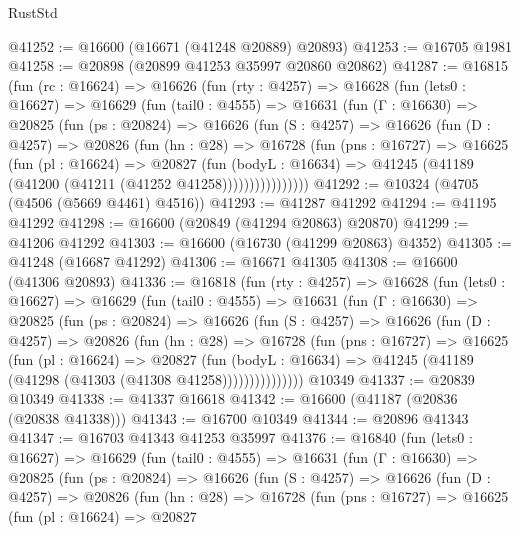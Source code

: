 \begin{lexlean}{RustStd}
\begin{coremodule}
{\begin{coremodule}
{{{{{{{{{{{{{{{{{{{{{{{{{{{{{{{{{{{{{{{{{{{{{{{{{{{{{{{@41252 := @16600 (@16671 (@41248 @20889) @20893)
@41253 := @16705 @1981
@41258 := @20898 (@20899 @41253 @35997 @20860 @20862)
@41287 := @16815
    (fun (rc : @16624) =>
    @16626
      (fun (rty : @4257) =>
      @16628
        (fun (lets0 : @16627) =>
        @16629
          (fun (tail0 : @4555) =>
          @16631
            (fun (Γ : @16630) =>
            @20825
              (fun (ps : @20824) =>
              @16626
                (fun (S : @4257) =>
                @16626
                  (fun (D : @4257) =>
                  @20826
                    (fun (hn : @28) =>
                    @16728
                      (fun (pns : @16727) =>
                      @16625
                        (fun (pl : @16624) =>
                        @20827
                          (fun (bodyL : @16634) =>
                          @41245 (@41189 (@41200 (@41211 (@41252 @41258))))))))))))))))
@41292 := @10324 (@4705 (@4506 (@5669 @4461) @4516))
@41293 := @41287 @41292
@41294 := @41195 @41292
@41298 := @16600 (@20849 (@41294 @20863) @20870)
@41299 := @41206 @41292
@41303 := @16600 (@16730 (@41299 @20863) @4352)
@41305 := @41248 (@16687 @41292)
@41306 := @16671 @41305
@41308 := @16600 (@41306 @20893)
@41336 := @16818
    (fun (rty : @4257) =>
    @16628
      (fun (lets0 : @16627) =>
      @16629
        (fun (tail0 : @4555) =>
        @16631
          (fun (Γ : @16630) =>
          @20825
            (fun (ps : @20824) =>
            @16626
              (fun (S : @4257) =>
              @16626
                (fun (D : @4257) =>
                @20826
                  (fun (hn : @28) =>
                  @16728
                    (fun (pns : @16727) =>
                    @16625
                      (fun (pl : @16624) =>
                      @20827
                        (fun (bodyL : @16634) =>
                        @41245 (@41189 (@41298 (@41303 (@41308 @41258)))))))))))))))
    @10349
@41337 := @20839 @10349
@41338 := @41337 @16618
@41342 := @16600 (@41187 (@20836 (@20838 @41338)))
@41343 := @16700 @10349
@41344 := @20896 @41343
@41347 := @16703 @41343 @41253 @35997
@41376 := @16840
    (fun (lets0 : @16627) =>
    @16629
      (fun (tail0 : @4555) =>
      @16631
        (fun (Γ : @16630) =>
        @20825
          (fun (ps : @20824) =>
          @16626
            (fun (S : @4257) =>
            @16626
              (fun (D : @4257) =>
              @20826
                (fun (hn : @28) =>
                @16728
                  (fun (pns : @16727) =>
                  @16625
                    (fun (pl : @16624) =>
                    @20827
}}}}}}}}}}}}}}}}}}}}}}}}}}}}}}}}}}}}}}}}}}}}}}}}}}}}}}}
\end{coremodule}}
\end{coremodule}
\end{lexlean}
